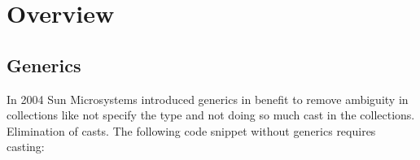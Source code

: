 \documentclass{sig-alternate-05-2015}
\begin{document}
%
\author{
%
%
\alignauthor
Daniella Angelos\\
       \\
       \\
       \\
\alignauthor
Thiago Cavalcanti\\
        \\
       \\
\alignauthor Vin\'{i}cius Correa\\
       \\
       \\
\and  %
\alignauthor Rodrigo Bonif\'{a}cio\\
     \\
       \\
}

\maketitle





\section{Overview}

\subsection{Generics}
In 2004 Sun Microsystems introduced generics in benefit to remove ambiguity in collections like not specify the type and not doing so much cast in the collections.
Elimination of casts. The following code snippet without generics requires casting:
\end{document}
